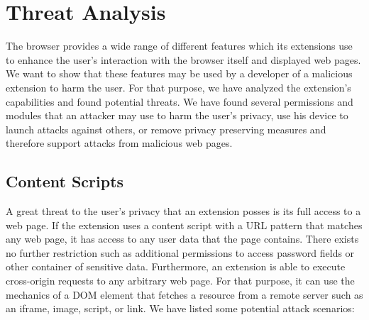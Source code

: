 
\chapter{Threat Analysis}
\label{chp:threatAnalysis}

	The browser provides a wide range of different features which its extensions use to enhance the user's interaction with the browser itself and displayed web pages. We want to show that these features may be used by a developer of a malicious extension to harm the user. For that purpose, we have analyzed the extension's capabilities and found potential threats. We have found several permissions and modules that an attacker may use to harm the user's privacy, use his device to launch attacks against others, or remove privacy preserving measures and therefore support attacks from malicious web pages. 

\section{Content Scripts}
\label{sec:threatAnalysis:contentScripts}

	A great threat to the user's privacy that an extension posses is its full access to a web page. If the extension uses a content script with a URL pattern that matches any web page, it has access to any user data that the page contains. There exists no further restriction such as additional permissions to access password fields or other container of sensitive data. Furthermore, an extension is able to execute cross-origin requests to any arbitrary web page. For that purpose, it can use the mechanics of a DOM element that fetches a resource from a remote server such as an iframe, image, script, or link. We have listed some potential attack scenarios:
	
